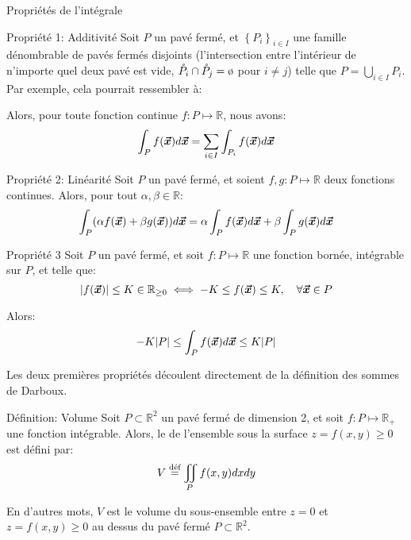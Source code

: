 \documentclass[a4paper]{article}
\begin{document}
\begin{parag}{Propriétés de l'intégrale}
    \begin{subparag}{Propriété 1: Additivité}
        Soit $P$ un pavé fermé, et $\left\{P_i\right\}_{i \in I}$ une famille dénombrable de pavés fermés disjoints (l'intersection entre l'intérieur de n'importe quel deux pavé est vide, $\mathring{P}_i \cap \mathring{P}_j = \o$ pour $i \neq j$) telle que $P = \bigcup_{i \in I} P_i$. Par exemple, cela pourrait ressembler à: 

        Alors, pour toute fonction continue $f: P \mapsto \mathbb{R}$, nous avons: 
        \[\int_{P} f\left(\bvec{x}\right) d \bvec{x} = \sum_{i \in I}^{} \int_{P_i} f\left(\bvec{x}\right) d \bvec{x}\]
    \end{subparag}

    \begin{subparag}{Propriété 2: Linéarité}
        Soit $P$ un pavé fermé, et soient $f, g : P \mapsto \mathbb{R}$ deux fonctions continues. Alors, pour tout $\alpha, \beta \in \mathbb{R}$:
        \[\int_{P} \left(\alpha f\left(\bvec{x}\right) + \beta g\left(\bvec{x}\right)\right)d \bvec{x} = \alpha \int_{P} f\left(\bvec{x}\right)d \bvec{x} + \beta \int_{P} g\left(\bvec{x}\right) d \bvec{x}\]
    \end{subparag}
    
    \begin{subparag}{Propriété 3}
        Soit $P$ un pavé fermé, et soit $f : P \mapsto\mathbb{R}$ une fonction bornée, intégrable sur $P$, et telle que: 
        \[\left|f\left(\bvec{x}\right)\right| \leq K \in \mathbb{R}_{\geq 0} \iff -K \leq f\left(\bvec{x}\right) \leq K, \mathspace \forall \bvec{x} \in P\]

        Alors: 
        \[-K \left|P\right| \leq \int_P f\left(\bvec{x}\right)d \bvec{x} \leq K \left|P\right|\]
    \end{subparag}
    
    Les deux premières propriétés découlent directement de la définition des sommes de Darboux.
\end{parag}

\begin{parag}{Définition: Volume}
    Soit $P \subset\mathbb{R}^2$ un pavé fermé de dimension 2, et soit $f : P \mapsto \mathbb{R}_+$ une fonction intégrable. Alors, le  de l'ensemble sous la surface $z = f\left(x, y\right) \geq0$ est défini par: 
    \[V \over{=}{déf} \iint_P f\left(x, y\right) dx dy\]
    
    En d'autres mots, $V$ est le volume du sous-ensemble entre $z = 0$ et $z = f\left(x, y\right) \geq 0$ au dessus du pavé fermé $P \subset \mathbb{R}^2$.
\end{parag}
\end{document}
